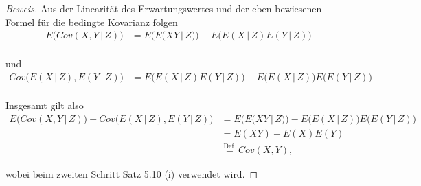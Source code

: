 \documentclass[10pt]{article}
\newcommand{\gap}{\,\vert\,}
\begin{document}
\begin{proof}[Beweis] Aus der Linearität des Erwartungswertes und der eben bewiesenen Formel für die bedingte Kovarianz folgen
	\begin{align*}
		E\big(Cov(X,Y \gap Z)\big) &= E\big( E\big( XY \gap Z \big) \big) - E\big(E(X \gap Z)E(Y \gap Z)\big) \\
	\end{align*}
	
	und
	\begin{align*}
		Cov\big(E(X \gap Z), E(Y \gap Z)\big) &=  E\big(E(X \gap Z)E(Y \gap Z)\big) - E\big(E(X \gap Z)\big)E\big(E(Y \gap Z)\big) \\
	\end{align*}

	Insgesamt gilt also 
	\begin{align*}
		E\big(Cov(X,Y \gap Z)\big) + Cov\big(E(X \gap Z), E(Y \gap Z)\big) &= E\big( E\big( XY \gap Z \big) \big) - 
																			 E\big(E(X \gap Z)\big)E\big(E(Y \gap Z)\big)  \\
																		&= E(XY) - E(X)E(Y) 							  \\
																		&\overset{\text{Def.}}{=} Cov(X,Y),
	\end{align*}

	wobei beim zweiten Schritt Satz 5.10 (i) verwendet wird.
\end{proof}
\end{document}
